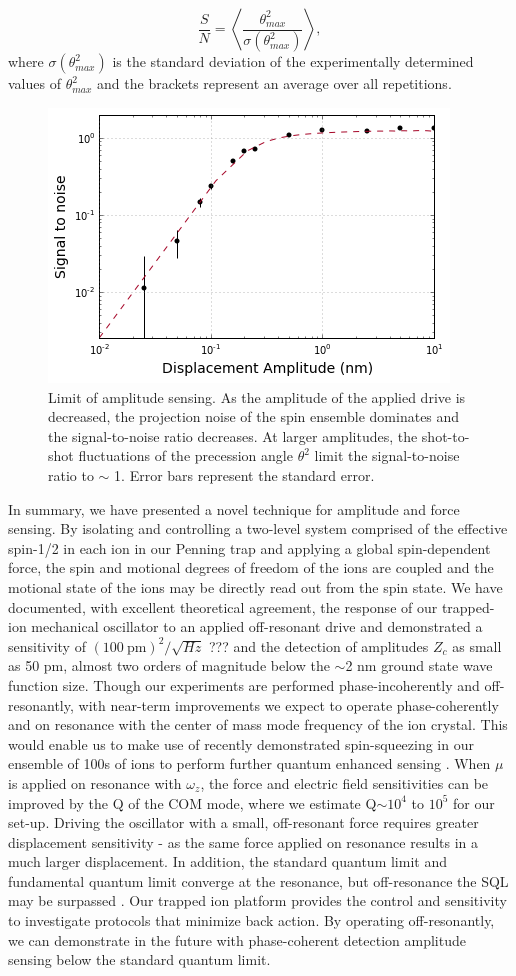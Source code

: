 \documentclass[aps,prl,twocolumn,superscriptaddress,floatfix]{revtex4-1}
\begin{document}
\begin{equation}
\frac{S}{N} = \left< \frac{\theta^{2}_{max}}{\sigma(\theta^{2}_{max})} \right>,
\end{equation}
where $\sigma(\theta^{2}_{max})$ is the standard deviation of the experimentally determined values of $\theta^{2}_{max}$ and the brackets represent an average over all repetitions.
\begin{figure}
\includegraphics[width=.45\textwidth]{sense_lim}
\caption{Limit of amplitude sensing. As the amplitude of the applied drive is decreased, the projection noise of the spin ensemble dominates and the signal-to-noise ratio decreases. At larger amplitudes, the shot-to-shot fluctuations of the precession angle $\theta^{2}$ limit the signal-to-noise ratio to $\sim$ 1. Error bars represent the standard error.}\label{Fig sens}
\end{figure}

In summary, we have presented a novel technique for amplitude and force sensing. By isolating and controlling a two-level system comprised of the effective spin-1/2 in each ion in our Penning trap and applying a global spin-dependent force, the spin and motional degrees of freedom of the ions are coupled and the motional state of the ions may be directly read out from the spin state. We have documented, with excellent theoretical agreement, the response of our trapped-ion mechanical oscillator to an applied off-resonant drive and demonstrated a sensitivity of $(100\:\mathrm{pm})^{2}/\sqrt{Hz}$ ??? and the detection of amplitudes $Z_{c}$ as small as 50 pm, almost two orders of magnitude below the $\sim$2 nm ground state wave function size. Though our experiments are performed phase-incoherently and off-resonantly, with near-term improvements we expect to operate phase-coherently and on resonance with the center of mass mode frequency of the ion crystal. This would enable us to make use of recently demonstrated spin-squeezing in our ensemble of 100s of ions \citep{Bohnet2015} to perform further quantum enhanced sensing \citep{Ivanov2016}. When $\mu$ is applied on resonance with $\omega_{z}$, the force and electric field sensitivities can be improved by the Q of the COM mode, where we estimate Q$\sim10^{4}$ to $10^{5}$ for our set-up. Driving the oscillator with a small, off-resonant force requires greater displacement sensitivity - as the same force applied on resonance results in a much larger displacement. In addition, the standard quantum limit and fundamental quantum limit converge at the resonance, but off-resonance the SQL may be surpassed \citep{Ivanov2016,Kampel2016,Schreppler2014a}. Our trapped ion platform provides the control and sensitivity to investigate protocols that minimize back action. By operating off-resonantly, we can demonstrate in the future with phase-coherent detection amplitude sensing below the standard quantum limit.
\end{document}
